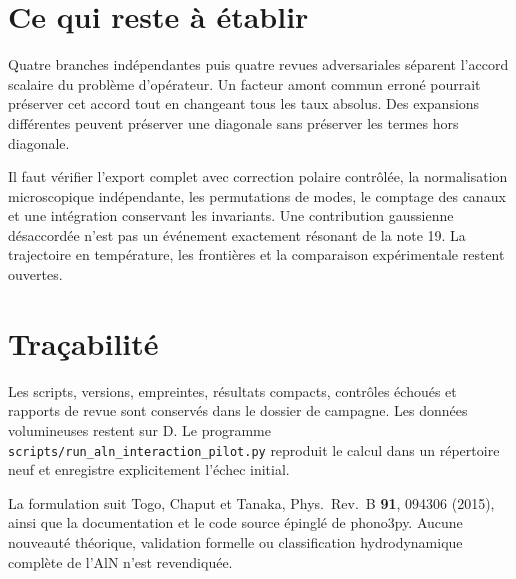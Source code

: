 \documentclass[11pt,a4paper]{article}
\begin{document}
\section{Ce qui reste à établir}
Quatre branches indépendantes puis quatre revues adversariales séparent
l'accord scalaire du problème d'opérateur. Un facteur amont commun erroné
pourrait préserver cet accord tout en changeant tous les taux absolus.
Des expansions différentes peuvent préserver une diagonale
sans préserver les termes hors diagonale.

Il faut vérifier l'export complet avec correction polaire contrôlée,
la normalisation microscopique indépendante, les permutations de modes,
le comptage des canaux et une intégration conservant les invariants.
Une contribution gaussienne désaccordée n'est pas un événement exactement
résonant de la note 19. La trajectoire en température, les frontières et
la comparaison expérimentale restent ouvertes.

\section{Traçabilité}
Les scripts, versions, empreintes, résultats compacts, contrôles échoués
et rapports de revue sont conservés dans le dossier de campagne.
Les données volumineuses restent sur D. Le programme
\texttt{scripts/run\_aln\_interaction\_pilot.py} reproduit le calcul
dans un répertoire neuf et enregistre explicitement l'échec initial.

La formulation suit Togo, Chaput et Tanaka,
Phys.\ Rev.\ B \textbf{91}, 094306 (2015), ainsi que la documentation
et le code source épinglé de phono3py. Aucune nouveauté théorique,
validation formelle ou classification hydrodynamique complète de l'AlN
n'est revendiquée.
\end{document}
